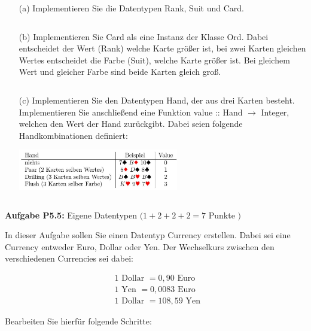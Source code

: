 \begin{itemize}
  \item [(a)] Implementieren Sie die Datentypen Rank, Suit und Card.

\inputminted{Haskell}{A5_4a.hs}

\item [(b)] Implementieren Sie Card als eine Instanz der Klasse Ord. Dabei entscheidet der Wert (Rank) welche Karte größer ist, bei zwei Karten gleichen Wertes entscheidet die Farbe (Suit), welche Karte größer ist. Bei gleichem Wert und gleicher Farbe sind beide Karten gleich groß. 

\inputminted{Haskell}{A5_4b.hs}

\item [(c)] Implementieren Sie den Datentypen Hand, der aus drei Karten besteht. Implementieren Sie anschließend eine Funktion value :: Hand $\rightarrow$ Integer, welchen den Wert der Hand zurückgibt. Dabei seien folgende Handkombinationen definiert:

\includegraphics[width=7cm]{2022_11_15_0a5a2eee0aef383b0ce9g-3}

\inputminted{Haskell}{A5_4c.hs}
\end{itemize}

\newpage

\textbf{Aufgabe P5.5:} Eigene Datentypen $(1+2+2+2=7$ Punkte $)$ 

In dieser Aufgabe sollen Sie einen Datentyp Currency erstellen. Dabei sei eine Currency entweder Euro, Dollar oder Yen. Der Wechselkurs zwischen den verschiedenen Currencies sei dabei:

$$
\begin{aligned}
&1 \text { Dollar }=0,90 \text { Euro } \\
&1 \text { Yen }=0,0083 \text { Euro } \\
&1 \text { Dollar }=108,59 \text { Yen }
\end{aligned}
$$

Bearbeiten Sie hierfür folgende Schritte:

